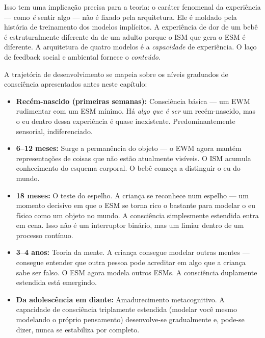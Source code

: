 \documentclass[11pt, twoside, openright]{book}
\begin{document}
Isso tem uma implicação precisa para a teoria: o caráter fenomenal da experiência --- como \textit{é} sentir algo --- não é fixado pela arquitetura. Ele é moldado pela história de treinamento dos modelos implícitos. A experiência de dor de um bebê é estruturalmente diferente da de um adulto porque o ISM que gera o ESM é diferente. A arquitetura de quatro modelos é a \textit{capacidade} de experiência. O laço de feedback social e ambiental fornece o \textit{conteúdo}.

A trajetória de desenvolvimento se mapeia sobre os níveis graduados de consciência apresentados antes neste capítulo:

\begin{itemize}
  \item \textbf{Recém-nascido (primeiras semanas):} Consciência básica --- um EWM rudimentar com um ESM mínimo. Há \textit{algo que é ser} um recém-nascido, mas o eu dentro dessa experiência é quase inexistente. Predominantemente sensorial, indiferenciado.
\end{itemize}

\begin{itemize}
  \item \textbf{6--12 meses:} Surge a permanência do objeto --- o EWM agora mantém representações de coisas que não estão atualmente visíveis. O ISM acumula conhecimento do esquema corporal. O bebê começa a distinguir o eu do mundo.
\end{itemize}

\begin{itemize}
  \item \textbf{18 meses:} O teste do espelho. A criança se reconhece num espelho --- um momento decisivo em que o ESM se torna rico o bastante para modelar o eu físico como um objeto no mundo. A consciência simplesmente estendida entra em cena. Isso não é um interruptor binário, mas um limiar dentro de um processo contínuo.
\end{itemize}

\begin{itemize}
  \item \textbf{3--4 anos:} Teoria da mente. A criança consegue modelar outras mentes --- consegue entender que outra pessoa pode acreditar em algo que a criança sabe ser falso. O ESM agora modela outros ESMs. A consciência duplamente estendida está emergindo.
\end{itemize}

\begin{itemize}
  \item \textbf{Da adolescência em diante:} Amadurecimento metacognitivo. A capacidade de consciência triplamente estendida (modelar você mesmo modelando o próprio pensamento) desenvolve-se gradualmente e, pode-se dizer, nunca se estabiliza por completo.
\end{itemize}
\end{document}
